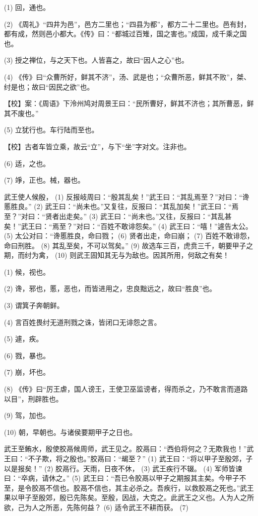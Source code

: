 \documentclass[12pt,UTF8]{ctexbook}
\begin{document}
(1) 回，通也。

(2) 《周礼》“四井为邑”，邑方二里也；“四县为都”，都方二十二里也。邑有封，都有成，然则邑小都大。《传》曰：“都城过百雉，国之害也。”成国，成千乘之国也。

(3) 授之禅位，与之天下也。人皆喜之，故曰“因人之心”也。

(4) 《传》曰“众曹所好，鲜其不济”，汤、武是也；“众曹所恶，鲜其不败”，桀、纣是也；故曰“因民之欲”也。

【校】案：《周语》下泠州鸠对周景王曰：“民所曹好，鲜其不济也；其所曹恶，鲜其不废也。”

(5) 立犹行也。车行陆而至也。

【校】古者车皆立乘，故云“立”，与下“坐”字对文。注非也。

(6) 适，之也。

(7) 竫，正也。械，器也。

武王使人候殷， (1) 反报岐周曰：“殷其乱矣！”武王曰：“其乱焉至？”对曰：“谗慝胜良。” (2) 武王曰：“尚未也。”又复往，反报曰：“其乱加矣！”武王曰：“焉至？”对曰：“贤者出走矣。” (3) 武王曰：“尚未也。”又往，反报曰：“其乱甚矣！”武王曰：“焉至？”对曰：“百姓不敢诽怨矣。” (4) 武王曰：“嘻！”遽告太公。 (5) 太公对曰：“谗慝胜良，命曰戮； (6) 贤者出走，命曰崩； (7) 百姓不敢诽怨，命曰刑胜。 (8) 其乱至矣，不可以驾矣。” (9) 故选车三百，虎贲三千，朝要甲子之期，而纣为禽， (10) 则武王固知其无与为敌也。因其所用，何敌之有矣！

(1) 候，视也。

(2) 谗，邪也，慝，恶也，而皆进用之，忠良黜远之，故曰“胜良”也。

(3) 谓箕子奔朝鲜。

(4) 言百姓畏纣无道刑戮之诛，皆闭口无诽怨之言。

(5) 遽，疾。

(6) 戮，暴也。

(7) 崩，坏也。

(8) 《传》曰“厉王虐，国人谤王，王使卫巫监谤者，得而杀之，乃不敢言而道路以目”，刑辟胜也。

(9) 驾，加也。

(10) 朝，早朝也。与诸侯要期甲子之日也。

武王至鲔水，殷使胶鬲候周师，武王见之。胶鬲曰：“西伯将何之？无欺我也！”武王曰：“不子欺，将之殷也。”胶鬲曰：“朅至？” (1) 武王曰：“将以甲子至殷郊，子以是报矣！” (2) 胶鬲行。天雨，日夜不休， (3) 武王疾行不辍。 (4) 军师皆谏曰：“卒病，请休之。” (5) 武王曰：“吾已令胶鬲以甲子之期报其主矣。今甲子不至，是令胶鬲不信也。胶鬲不信也，其主必杀之。吾疾行，以救胶鬲之死也。”武王果以甲子至殷郊，殷已先陈矣。至殷，因战，大克之。此武王之义也。人为人之所欲，己为人之所恶，先陈何益？ (6) 适令武王不耕而获。 (7)
\end{document}
